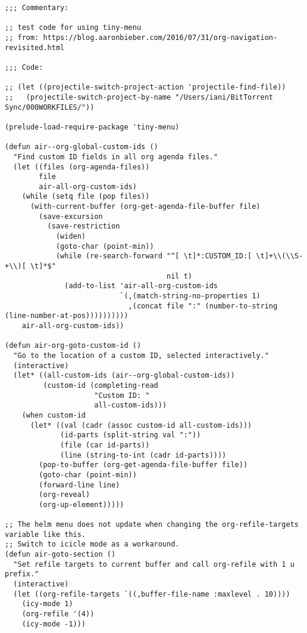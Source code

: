 \documentclass[11pt]{article}
\begin{document}
\begin{verbatim}
;;; Commentary:

;; test code for using tiny-menu
;; from: https://blog.aaronbieber.com/2016/07/31/org-navigation-revisited.html

;;; Code:

;; (let ((projectile-switch-project-action 'projectile-find-file))
;;   (projectile-switch-project-by-name "/Users/iani/BitTorrent Sync/000WORKFILES/"))

(prelude-load-require-package 'tiny-menu)

(defun air--org-global-custom-ids ()
  "Find custom ID fields in all org agenda files."
  (let ((files (org-agenda-files))
        file
        air-all-org-custom-ids)
    (while (setq file (pop files))
      (with-current-buffer (org-get-agenda-file-buffer file)
        (save-excursion
          (save-restriction
            (widen)
            (goto-char (point-min))
            (while (re-search-forward "^[ \t]*:CUSTOM_ID:[ \t]+\\(\\S-+\\)[ \t]*$"
                                      nil t)
              (add-to-list 'air-all-org-custom-ids
                           `(,(match-string-no-properties 1)
                             ,(concat file ":" (number-to-string (line-number-at-pos))))))))))
    air-all-org-custom-ids))

(defun air-org-goto-custom-id ()
  "Go to the location of a custom ID, selected interactively."
  (interactive)
  (let* ((all-custom-ids (air--org-global-custom-ids))
         (custom-id (completing-read
                     "Custom ID: "
                     all-custom-ids)))
    (when custom-id
      (let* ((val (cadr (assoc custom-id all-custom-ids)))
             (id-parts (split-string val ":"))
             (file (car id-parts))
             (line (string-to-int (cadr id-parts))))
        (pop-to-buffer (org-get-agenda-file-buffer file))
        (goto-char (point-min))
        (forward-line line)
        (org-reveal)
        (org-up-element)))))

;; The helm menu does not update when changing the org-refile-targets variable like this.
;; Switch to icicle mode as a workaround.
(defun air-goto-section ()
  "Set refile targets to current buffer and call org-refile with 1 u prefix."
  (interactive)
  (let ((org-refile-targets `((,buffer-file-name :maxlevel . 10))))
    (icy-mode 1)
    (org-refile '(4))
    (icy-mode -1)))


\end{verbatim}
\end{document}
